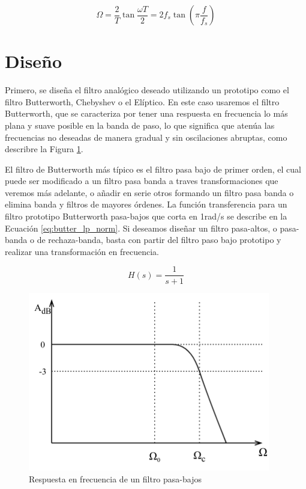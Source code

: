 \begin{equation}
  \Omega = \frac{2}{T} \tan \frac{\omega T}{2} = 2 f_s \tan\left(\pi \frac{f}{f_s}\right)
  \label{eq:relacion_tangencial_frec_ang}
\end{equation}

\section{Diseño}
Primero, se diseña el filtro analógico deseado utilizando un prototipo como el filtro Butterworth, Chebyshev o el Elíptico. En este caso usaremos el filtro Butterworth, que se caracteriza por tener una respuesta en frecuencia lo más plana y suave posible en la banda de paso, lo que significa que atenúa las frecuencias no deseadas de manera gradual y sin oscilaciones abruptas, como describre la Figura \ref{fig:diagrama_bode_pasa_bajos}.

El filtro de Butterworth más típico es el filtro pasa bajo de primer orden, el cual puede ser modificado a un filtro pasa banda a traves transformaciones que veremos más adelante, o añadir en serie otros formando un filtro pasa banda o elimina banda y filtros de mayores órdenes. La función transferencia para un filtro prototipo Butterworth pasa-bajos que corta en 1rad/s se describe en la Ecuación \ref{eq:butter_lp_norm}. Si deseamos diseñar un filtro pasa-altos, o pasa-banda o de rechaza-banda, basta con partir del filtro paso bajo prototipo y realizar una transformación en frecuencia.

\begin{equation}
  H(s) = \frac{1}{s+1}
  \label{eq:butter_lp_norm}
\end{equation}

\begin{figure}[H]
  \centering
  \includegraphics[width=300pt]{images/diagramas-bode-filtro-lp.png}
  \caption{Respuesta en frecuencia de un filtro pasa-bajos}
  \label{fig:diagrama_bode_pasa_bajos}
\end{figure}

